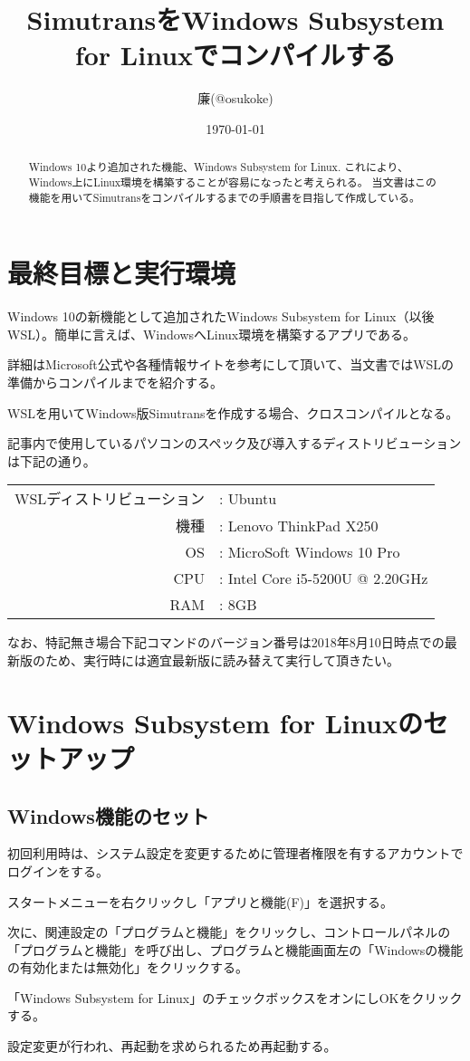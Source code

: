 \documentclass[autodetect-engine,dvipdfmx-if-dvi,ja=standard,a4j]{bxjsarticle}
\title{SimutransをWindows Subsystem for Linuxでコンパイルする}
\author{廉(@osukoke)}
\date{\today}
\begin{document}
	\maketitle
	\begin{abstract}
		Windows 10より追加された機能、Windows Subsystem for Linux.
		これにより、Windows上にLinux環境を構築することが容易になったと考えられる。
		当文書はこの機能を用いてSimutransをコンパイルするまでの手順書を目指して作成している。
	\end{abstract}
	\section{最終目標と実行環境}
		Windows 10の新機能として追加されたWindows Subsystem for Linux（以後WSL）。簡単に言えば、WindowsへLinux環境を構築するアプリである。\par \noindent
		詳細はMicrosoft公式や各種情報サイトを参考にして頂いて、当文書ではWSLの準備からコンパイルまでを紹介する。\par
		WSLを用いてWindows版Simutransを作成する場合、クロスコンパイルとなる。\par
		記事内で使用しているパソコンのスペック及び導入するディストリビューションは下記の通り。\par\noindent
		\begin{center}	
			\begin{tabular}{rl}
				WSLディストリビューション & : Ubuntu \\
				機種 & : Lenovo ThinkPad X250 \\
				OS & : MicroSoft Windows 10 Pro \\
				CPU & : Intel Core i5-5200U @ 2.20GHz \\
				RAM & : 8GB \\
			\end{tabular}
		\end{center}
	\par
		なお、特記無き場合下記コマンドのバージョン番号は2018年8月10日時点での最新版のため、実行時には適宜最新版に読み替えて実行して頂きたい。\par
	\section{Windows Subsystem for Linuxのセットアップ}
		\subsection{Windows機能のセット}
			初回利用時は、システム設定を変更するために管理者権限を有するアカウントでログインをする。\par\noindent
			スタートメニューを右クリックし「アプリと機能(F)」を選択する。\par
			次に、関連設定の「プログラムと機能」をクリックし、コントロールパネルの「プログラムと機能」を呼び出し、プログラムと機能画面左の「Windowsの機能の有効化または無効化」をクリックする。\par\noindent
			「Windows Subsystem for Linux」のチェックボックスをオンにしOKをクリックする。\par
			設定変更が行われ、再起動を求められるため再起動する。
\end{document}

